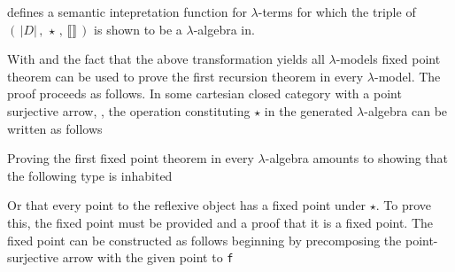  defines a semantic intepretation function for $\lambda$-terms for
which the triple of $( \, |D| \, , \, \star \, , \, \llbracket \rrbracket \,)$
is shown to be  a $\lambda$-algebra in.


With  and the fact that the above transformation yields all
$\lambda$-models
fixed point theorem can be used to prove the first recursion theorem in every
$\lambda$-model. The proof proceeds as follows. In some cartesian closed
category with a point surjective arrow, , the operation
constituting $\star$ in the generated $\lambda$-algebra can be written as
follows


Proving the first fixed point theorem in every $\lambda$-algebra amounts to
showing that the following type is inhabited

Or that every point to the reflexive object has a fixed point under $\star$. To
prove this, the fixed point must be provided and a proof that it is a fixed
point. The fixed point can be constructed as follows beginning by precomposing the
point-surjective arrow with the given point to \verb|f|

